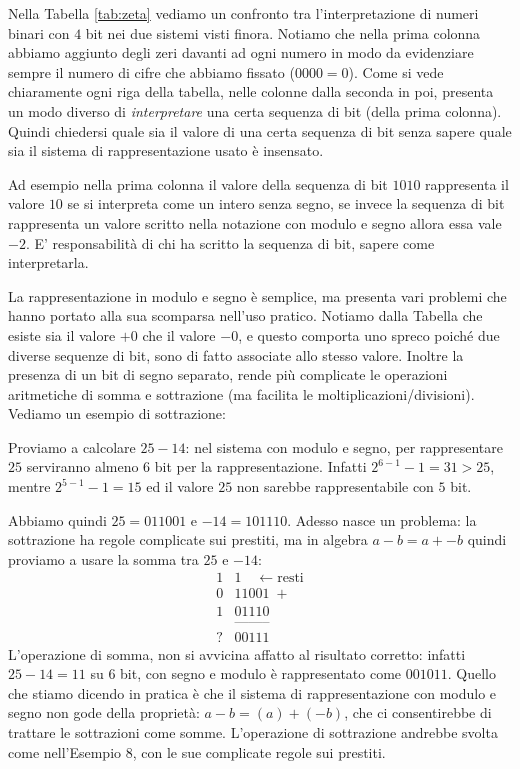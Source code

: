 


Nella Tabella \ref{tab:zeta} vediamo un confronto tra l'interpretazione di numeri binari con $4$ bit nei due sistemi visti finora. Notiamo che nella prima
colonna abbiamo aggiunto degli zeri davanti ad ogni numero in modo da
evidenziare sempre il numero di cifre che abbiamo fissato ($0000 = 0$). Come si
vede chiaramente ogni riga della tabella, nelle colonne dalla seconda in poi, presenta un modo diverso di \emph{interpretare} una certa sequenza di bit (della prima colonna). Quindi chiedersi quale sia il valore di una
certa sequenza di bit senza sapere quale sia il sistema di rappresentazione
usato è insensato.

Ad esempio nella prima colonna il valore della sequenza di bit $1010$
rappresenta il valore $10$ se si interpreta come un intero senza segno, se
invece la sequenza di bit rappresenta un valore scritto nella notazione con
modulo e segno allora essa vale $-2$. E' responsabilità di chi ha scritto la
sequenza di bit, sapere come interpretarla.

La rappresentazione in modulo e segno è semplice, ma presenta vari problemi che
hanno portato alla sua scomparsa nell'uso pratico. Notiamo dalla Tabella che
esiste sia il valore $+0$ che il valore $-0$, e questo comporta uno spreco
poiché due diverse sequenze di bit, sono di fatto associate allo stesso valore.
Inoltre la presenza di un bit di segno separato, rende più complicate le
operazioni aritmetiche di somma e sottrazione (ma facilita le
moltiplicazioni/divisioni). Vediamo un esempio di sottrazione:

\begin{ex} Proviamo a calcolare $25 - 14$: nel sistema con modulo e segno, per rappresentare $25$ serviranno almeno $6$ bit per la rappresentazione. Infatti $2^{6-1}-1 = 31 > 25$, mentre $2^{5-1}-1 = 15$ ed il valore $25$ non sarebbe rappresentabile con $5$ bit.

Abbiamo quindi $25 = 011001$ e  $-14 = 101110$. Adesso nasce un problema:
la sottrazione ha regole complicate sui prestiti, ma in algebra $a-b = a+ -b$ quindi proviamo a usare la somma tra $25$ e $-14$:
\begin{align*}
	    1&1 \quad \leftarrow\text{resti}\\
	    0&11001 \;+\\
	    1&01110\\[-0.5ex]
      &\text{--------}\\[-0.5ex]
	    ?&00111
\end{align*} L'operazione di somma, non si avvicina affatto
al risultato corretto: infatti $25-14=11$ su $6$ bit, con segno e modulo è rappresentato come $001011$. Quello che stiamo dicendo in pratica è che
il sistema di rappresentazione con modulo e segno non gode della proprietà: $a-b = (a)+(-b)$, che ci consentirebbe di trattare le sottrazioni come somme.
L'operazione di sottrazione andrebbe svolta come nell'Esempio 8, con le sue complicate regole sui prestiti.
\end{ex}

